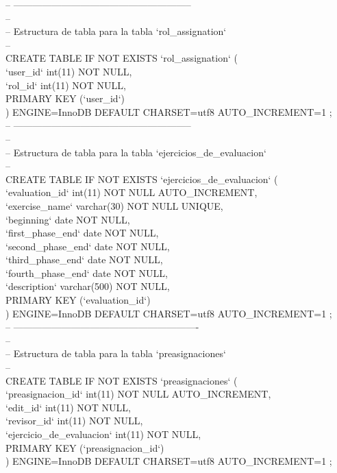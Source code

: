 -- --------------------------------------------------------\\

--\\
-- Estructura de tabla para la tabla `rol\_assignation`\\
--\\

CREATE TABLE IF NOT EXISTS `rol\_assignation` (\\
`user\_id` int(11) NOT NULL,\\
`rol\_id` int(11) NOT NULL,\\
PRIMARY KEY (`user\_id`)\\
) ENGINE=InnoDB DEFAULT CHARSET=utf8 AUTO\_INCREMENT=1 ;\\

-- --------------------------------------------------------\\

--\\
-- Estructura de tabla para la tabla `ejercicios\_de\_evaluacion`\\
--\\

CREATE TABLE IF NOT EXISTS `ejercicios\_de\_evaluacion` (\\
`evaluation\_id` int(11) NOT NULL AUTO\_INCREMENT,\\
`exercise\_name` varchar(30) NOT NULL UNIQUE,\\
`beginning` date NOT NULL,\\
`first\_phase\_end` date NOT NULL,\\
`second\_phase\_end` date NOT NULL,\\
`third\_phase\_end` date NOT NULL,\\
`fourth\_phase\_end` date NOT NULL,\\
`description` varchar(500) NOT NULL,\\
PRIMARY KEY (`evaluation\_id`)\\
) ENGINE=InnoDB DEFAULT CHARSET=utf8 AUTO\_INCREMENT=1 ;\\

-- ----------------------------------------------------------\\

--\\
-- Estructura de tabla para la tabla `preasignaciones`\\
--\\

CREATE TABLE IF NOT EXISTS `preasignaciones` (\\
`preasignacion\_id` int(11) NOT NULL AUTO\_INCREMENT,\\
`edit\_id` int(11) NOT NULL,\\
`revisor\_id` int(11) NOT NULL,\\
`ejercicio\_de\_evaluacion` int(11) NOT NULL,\\
PRIMARY KEY (`preasignacion\_id`)\\
) ENGINE=InnoDB DEFAULT CHARSET=utf8 AUTO\_INCREMENT=1 ;\\


